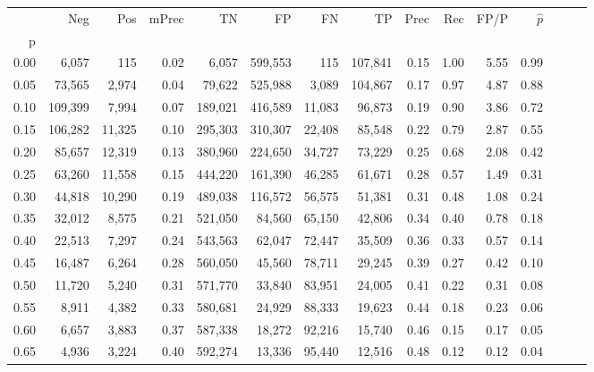 \begin{tabular}{rrrrrrrrrrrrrrr}
\toprule
{} &      Neg &     Pos & mPrec &       TN &       FP &       FN &       TP &  Prec &   Rec &  FP/P & $\hat{p}$ \\
p    &          &         &       &          &          &          &          &       &       &       &           \\
\midrule
0.00 &    6,057 &     115 &  0.02 &    6,057 &  599,553 &      115 &  107,841 &  0.15 &  1.00 &  5.55 &      0.99 \\
0.05 &   73,565 &   2,974 &  0.04 &   79,622 &  525,988 &    3,089 &  104,867 &  0.17 &  0.97 &  4.87 &      0.88 \\
0.10 &  109,399 &   7,994 &  0.07 &  189,021 &  416,589 &   11,083 &   96,873 &  0.19 &  0.90 &  3.86 &      0.72 \\
0.15 &  106,282 &  11,325 &  0.10 &  295,303 &  310,307 &   22,408 &   85,548 &  0.22 &  0.79 &  2.87 &      0.55 \\
0.20 &   85,657 &  12,319 &  0.13 &  380,960 &  224,650 &   34,727 &   73,229 &  0.25 &  0.68 &  2.08 &      0.42 \\
0.25 &   63,260 &  11,558 &  0.15 &  444,220 &  161,390 &   46,285 &   61,671 &  0.28 &  0.57 &  1.49 &      0.31 \\
0.30 &   44,818 &  10,290 &  0.19 &  489,038 &  116,572 &   56,575 &   51,381 &  0.31 &  0.48 &  1.08 &      0.24 \\
0.35 &   32,012 &   8,575 &  0.21 &  521,050 &   84,560 &   65,150 &   42,806 &  0.34 &  0.40 &  0.78 &      0.18 \\
0.40 &   22,513 &   7,297 &  0.24 &  543,563 &   62,047 &   72,447 &   35,509 &  0.36 &  0.33 &  0.57 &      0.14 \\
0.45 &   16,487 &   6,264 &  0.28 &  560,050 &   45,560 &   78,711 &   29,245 &  0.39 &  0.27 &  0.42 &      0.10 \\
0.50 &   11,720 &   5,240 &  0.31 &  571,770 &   33,840 &   83,951 &   24,005 &  0.41 &  0.22 &  0.31 &      0.08 \\
0.55 &    8,911 &   4,382 &  0.33 &  580,681 &   24,929 &   88,333 &   19,623 &  0.44 &  0.18 &  0.23 &      0.06 \\
0.60 &    6,657 &   3,883 &  0.37 &  587,338 &   18,272 &   92,216 &   15,740 &  0.46 &  0.15 &  0.17 &      0.05 \\
0.65 &    4,936 &   3,224 &  0.40 &  592,274 &   13,336 &   95,440 &   12,516 &  0.48 &  0.12 &  0.12 &      0.04 \\

\end{tabular}

